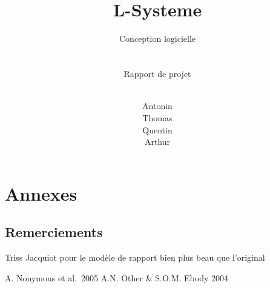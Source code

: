 \documentclass[
	headsepline=on,
	footsepline=on,
	twoside=off,
	abstract=on,
	DIV=10
]{scrreprt}
\title{
	\hrulefill
	\vfill\\
	\Huge \bfseries \\L-Systeme
}
\subtitle{
	Conception logicielle\\
	\hfill
	\\
	\hrulefill
	\hfill\\
	{\normalfont Rapport de projet}
}
\author{
	\small
	\hfill\\
	Antonin \bsc{Boyon}\\
	Thomas \bsc{Lalong}\\
	Quentin \bsc{Legot}\\
	Arthur \bsc{Page}
}
\date{}
\begin{document}
	\maketitle
	\tableofcontents
	\listoffigures
	\clearpage



	
	
	
	
	
	
	\cleardoublepage
	\pagebreak

	\chapter{Annexes}
	\section{Remerciements}
	Triss Jacquiot pour le modèle de rapport bien plus beau que l'original
	\begin{thebibliography}{}
		A. Nonymous et al.\ 2005
		A.N. Other \& S.O.M. Ebody 2004
	\end{thebibliography}
\end{document}
